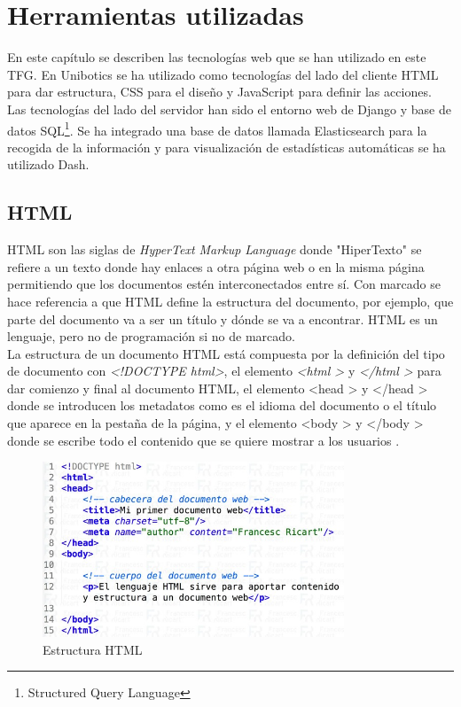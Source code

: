 \chapter{Herramientas utilizadas}
\label{herramientas}
En este capítulo se describen las tecnologías web que se han utilizado en este TFG. En Unibotics se ha utilizado como tecnologías del lado del cliente HTML para dar estructura, CSS para el diseño y JavaScript para definir las acciones. Las tecnologías del lado del servidor han sido el entorno web de Django y base de datos SQL\footnote{Structured Query Language}. Se ha integrado una base de datos llamada Elasticsearch para la recogida de la información y para visualización de estadísticas automáticas se ha utilizado Dash.

\section{HTML}
HTML son las siglas de \textit{HyperText Markup Language} donde "HiperTexto" se refiere a un texto donde hay enlaces a otra página web o en la misma página permitiendo que los documentos estén interconectados entre sí. Con marcado se hace referencia a que HTML define la estructura del documento, por ejemplo, que parte del documento va a ser un título y dónde se va a encontrar. HTML es un lenguaje, pero no de programación si no de marcado.\\

La estructura de un documento HTML está compuesta por la definición del tipo de documento con \textit{\textless!DOCTYPE html\textgreater}, el elemento  \textit{\textless html \textgreater} y \textit{\textless/html \textgreater} para dar comienzo y final al documento HTML, el elemento {\textless head \textgreater} y {\textless/head \textgreater} donde se introducen los metadatos como es el idioma del documento o el título que aparece en la pestaña de la página, y el elemento {\textless body \textgreater} y {\textless/body \textgreater} donde se escribe todo el contenido que se quiere mostrar a los usuarios \cite{html}.

\begin{figure}[H]
    \centering
    \includegraphics[width=9cm, keepaspectratio]{img/html.jpg}
    \caption{Estructura HTML}
    \label{fig:html}
\end{figure}

